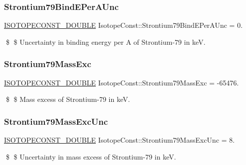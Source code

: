 \subsubsection{\texorpdfstring{Strontium79\+Bind\+E\+Per\+A\+Unc}{Strontium79BindEPerAUnc}}
{\footnotesize\ttfamily \mbox{\hyperlink{group___isotope_const-_macros_ga8f45a7272ce02c0b4c65c44636ed719a}{I\+S\+O\+T\+O\+P\+E\+C\+O\+N\+S\+T\+\_\+\+D\+O\+U\+B\+LE}} Isotope\+Const\+::\+Strontium79\+Bind\+E\+Per\+A\+Unc = 0.}

\$ \$ Uncertainty in binding energy per A of Strontium-\/79 in keV. \mbox{\label{group___isotope_const-_strontium-_sr79_gaf3536931000512e569ca145f1919330c}} 
\subsubsection{\texorpdfstring{Strontium79\+Mass\+Exc}{Strontium79MassExc}}
{\footnotesize\ttfamily \mbox{\hyperlink{group___isotope_const-_macros_ga8f45a7272ce02c0b4c65c44636ed719a}{I\+S\+O\+T\+O\+P\+E\+C\+O\+N\+S\+T\+\_\+\+D\+O\+U\+B\+LE}} Isotope\+Const\+::\+Strontium79\+Mass\+Exc = -\/65476.}

\$ \$ Mass excess of Strontium-\/79 in keV. \mbox{\label{group___isotope_const-_strontium-_sr79_ga028d1589379e173ca3b7bf4a51b47684}} 
\subsubsection{\texorpdfstring{Strontium79\+Mass\+Exc\+Unc}{Strontium79MassExcUnc}}
{\footnotesize\ttfamily \mbox{\hyperlink{group___isotope_const-_macros_ga8f45a7272ce02c0b4c65c44636ed719a}{I\+S\+O\+T\+O\+P\+E\+C\+O\+N\+S\+T\+\_\+\+D\+O\+U\+B\+LE}} Isotope\+Const\+::\+Strontium79\+Mass\+Exc\+Unc = 8.}

\$ \$ Uncertainty in mass excess of Strontium-\/79 in keV. \mbox{\label{group___isotope_const-_strontium-_sr79_gaa1a8d42f77fba1fdef59a2d8fa52ab5f}} 
